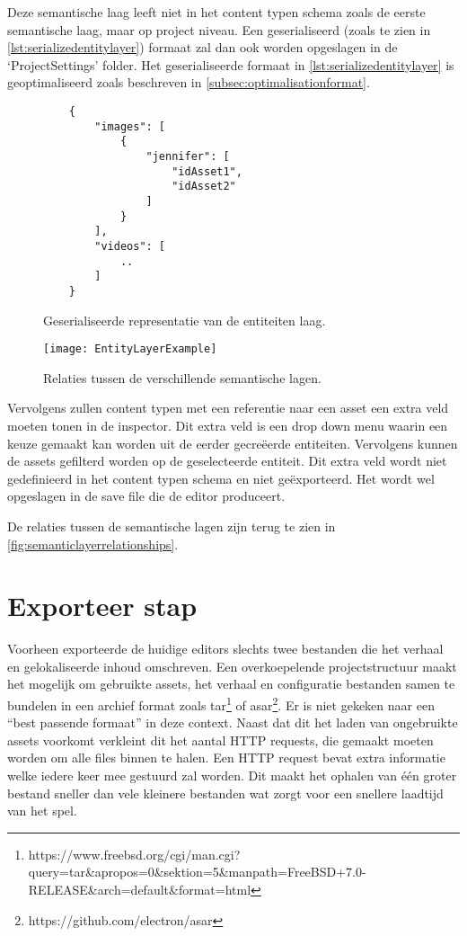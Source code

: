Deze semantische laag leeft niet in het content typen schema zoals de eerste semantische laag, maar op project niveau. Een geserialiseerd (zoals te zien in \autoref{lst:serializedentitylayer}) formaat zal dan ook worden opgeslagen in de ‘ProjectSettings’ folder. Het geserialiseerde formaat in \autoref{lst:serializedentitylayer} is geoptimaliseerd zoals beschreven in \autoref{subsec:optimalisationformat}.

\begin{figure}[htb]
    \centering
    \lstset{language=JavaScript}
    \begin{lstlisting}
    {
        "images": [
            {
                "jennifer": [
                    "idAsset1",
                    "idAsset2"
                ]
            }
        ],
        "videos": [
            ..
        ]
    }          
    \end{lstlisting}
    \caption{Geserialiseerde representatie van de entiteiten laag.}
    \label{lst:serializedentitylayer}
\end{figure}

\begin{wrapfigure}{r}{0.42\textwidth}
    \texttt{[image: EntityLayerExample]}
    \caption{Relaties tussen de verschillende semantische lagen.}
    \label{fig:semanticlayerrelationships}
    \centering
\end{wrapfigure}

Vervolgens zullen content typen met een referentie naar een asset een extra veld moeten tonen in de inspector. Dit extra veld is een drop down menu waarin een keuze gemaakt kan worden uit de eerder gecreëerde entiteiten. Vervolgens kunnen de assets gefilterd worden op de geselecteerde entiteit. Dit extra veld wordt niet gedefinieerd in het content typen schema en niet geëxporteerd. Het wordt wel opgeslagen in de save file die de editor produceert.

De relaties tussen de semantische lagen zijn terug te zien in \autoref{fig:semanticlayerrelationships}.

\section{Exporteer stap}
\label{sec:exportproces}
Voorheen exporteerde de huidige editors slechts twee bestanden die het verhaal en gelokaliseerde inhoud omschreven. Een overkoepelende projectstructuur maakt het mogelijk om gebruikte assets, het verhaal en configuratie bestanden samen te bundelen in een archief format zoals tar\footnote{https://www.freebsd.org/cgi/man.cgi?query=tar\&apropos=0\&sektion=5\&manpath=FreeBSD+7.0-RELEASE\&arch=default\&format=html} of asar\footnote{https://github.com/electron/asar}. Er is niet gekeken naar een “best passende formaat” in deze context. Naast dat dit het laden van ongebruikte assets voorkomt verkleint dit het aantal HTTP requests, die gemaakt moeten worden om alle files binnen te halen. Een HTTP request bevat extra informatie welke iedere keer mee gestuurd zal worden\cite{Fielding1999}. Dit maakt het ophalen van één groter bestand sneller dan vele kleinere bestanden wat zorgt voor een snellere laadtijd van het spel.

